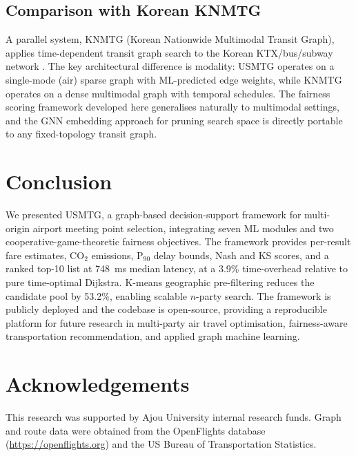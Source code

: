 \documentclass[review]{elsarticle}
\begin{document}
\subsection{Comparison with Korean KNMTG}

A parallel system, KNMTG (Korean Nationwide Multimodal Transit Graph), applies time-dependent transit graph search to the Korean KTX/bus/subway network \cite{kim2026knmtg}.
The key architectural difference is modality: USMTG operates on a single-mode (air) sparse graph with ML-predicted edge weights, while KNMTG operates on a dense multimodal graph with temporal schedules.
The fairness scoring framework developed here generalises naturally to multimodal settings, and the GNN embedding approach for pruning search space is directly portable to any fixed-topology transit graph.

\section{Conclusion}

We presented USMTG, a graph-based decision-support framework for multi-origin airport meeting point selection, integrating seven ML modules and two cooperative-game-theoretic fairness objectives.
The framework provides per-result fare estimates, CO$_2$ emissions, P$_{90}$ delay bounds, Nash and KS scores, and a ranked top-10 list at 748~ms median latency, at a 3.9\% time-overhead relative to pure time-optimal Dijkstra.
K-means geographic pre-filtering reduces the candidate pool by 53.2\%, enabling scalable $n$-party search.
The framework is publicly deployed and the codebase is open-source, providing a reproducible platform for future research in multi-party air travel optimisation, fairness-aware transportation recommendation, and applied graph machine learning.

\section*{Acknowledgements}

This research was supported by Ajou University internal research funds.
Graph and route data were obtained from the OpenFlights database (\url{https://openflights.org}) and the US Bureau of Transportation Statistics.
\end{document}
